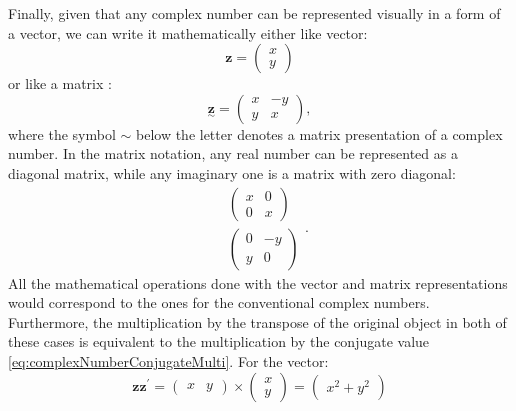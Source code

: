 \documentclass[
]{book}
\begin{document}
Finally, given that any complex number can be represented visually in a form of a vector, we can write it mathematically either like vector:
\begin{equation}
    \boldsymbol{z} = \begin{pmatrix} x \\ y \end{pmatrix}
    \label{eq:complexNumberVectors}
\end{equation}
or like a matrix \citep[ provides some examples based on these presentations]{Halliwell2015}:
\begin{equation}
    \underset{\sim}{\boldsymbol{z}} = \begin{pmatrix} x & -y \\ y & x \end{pmatrix} ,
    \label{eq:complexNumberMatrix}
\end{equation}
where the symbol \(\sim\) below the letter denotes a matrix presentation of a complex number. In the matrix notation, any real number can be represented as a diagonal matrix, while any imaginary one is a matrix with zero diagonal:
\begin{equation*}
    \begin{aligned}
        & \begin{pmatrix} x & 0 \\ 0 & x \end{pmatrix} \\
        & \begin{pmatrix} 0 & -y \\ y & 0 \end{pmatrix}
    \end{aligned} .
\end{equation*}
All the mathematical operations done with the vector and matrix representations would correspond to the ones for the conventional complex numbers. Furthermore, the multiplication by the transpose of the original object in both of these cases is equivalent to the multiplication by the conjugate value \eqref{eq:complexNumberConjugateMulti}. For the vector:
\begin{equation}
    \boldsymbol{z} \boldsymbol{z}^\prime = \begin{pmatrix} x & y \end{pmatrix} \times \begin{pmatrix} x \\ y \end{pmatrix} = \begin{pmatrix} x^2 + y^2 \end{pmatrix}
    \label{eq:complexNumberVectorsMulti}
\end{equation}
\end{document}
